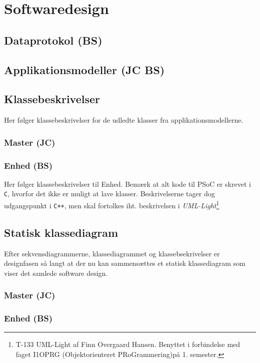 \chapter{Softwaredesign}

\section{Dataprotokol (BS)}


\section{Applikationsmodeller (JC BS)}


\section{Klassebeskrivelser}
Her følger klassebeskrivelser for de udledte klasser fra applikationsmodellerne.

\subsection{Master (JC)}






\subsection{Enhed (BS)}
Her følger klassebeskrivelser til Enhed. 
Bemærk at alt kode til PSoC er skrevet i \verb+C+, hvorfor det ikke er muligt at lave klasser. Beskrivelserne tager dog udgangspunkt i \verb-C++-, men skal fortolkes iht. beskrivelsen i \textit{UML-Light}\footnote{T-133 UML-Light af Finn Overgaard Hansen. Benyttet i forbindelse med faget I1OPRG (Objektorienteret PRoGrammering)på 1. semester.} 









\clearpage

\section{Statisk klassediagram}
Efter sekvensdiagrammerne, klassediagrammet og klassebsekrivelser er designfasen så langt at der nu kan sammensættes et statisk klassediagram som viser det samlede software design.

\subsection{Master (JC)}


\clearpage

\subsection{Enhed (BS)}



\clearpage

